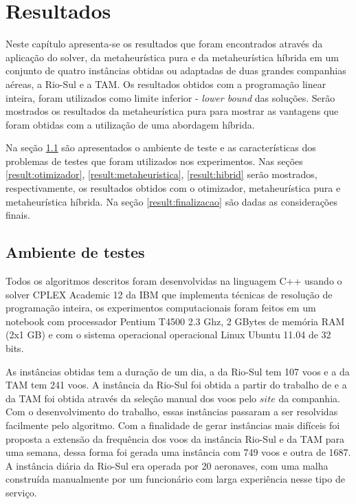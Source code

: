   \chapter{Resultados}


Neste capítulo apresenta-se os resultados que foram encontrados através da
aplicação do solver, da metaheurística pura e da metaheurística híbrida em um
conjunto de quatro instâncias obtidas ou adaptadas de duas grandes companhias
aéreas, a Rio-Sul e a TAM. Os resultados obtidos com a programação linear
inteira, foram utilizados como limite inferior - \textit{lower bound} das
soluções. Serão mostrados os resultados da metaheurística pura para mostrar as
vantagens que foram obtidas com a utilização de uma abordagem híbrida.

Na seção \ref{result:ambiente} são apresentados o ambiente de teste e as
características dos problemas de testes que foram utilizados nos
experimentos. Nas seções \ref{result:otimizador}, \ref{result:metaheuristica},
\ref{result:hibrid} serão mostrados, respectivamente, os resultados obtidos com
o otimizador, metaheurística pura e metaheurística híbrida. Na seção
\ref{result:finalizacao} são dadas as considerações finais.

\section{Ambiente de testes} \label{result:ambiente}

Todos os algoritmos descritos foram desenvolvidas na linguagem C++ usando o
solver CPLEX Academic 12 da IBM que implementa técnicas de resolução de
programação inteira, os experimentos computacionais foram feitos em um
notebook com processador Pentium T4500 2.3 Ghz, 2 GBytes de memória RAM (2x1 GB)
e com o sistema operacional operacional Linux Ubuntu 11.04 de 32 bits.

As instâncias obtidas tem a duração de um dia, a da Rio-Sul tem 107
voos e a da TAM tem 241 voos. A instância da Rio-Sul foi obtida a partir do
trabalho de \cite{pontes2002} e a da TAM foi obtida através da seleção manual dos voos
pelo $site$ da companhia. Com o desenvolvimento do trabalho, essas
instâncias passaram a ser resolvidas facilmente pelo algoritmo. Com a finalidade
de gerar instâncias mais difíceis foi proposta a extensão da frequência dos
voos da instância Rio-Sul e da TAM para uma semana, dessa forma foi gerada uma
instância com 749 voos e outra de 1687. A instância diária da Rio-Sul era
operada por 20 aeronaves, com uma malha construída manualmente por um
funcionário com larga experiência nesse tipo de serviço.

